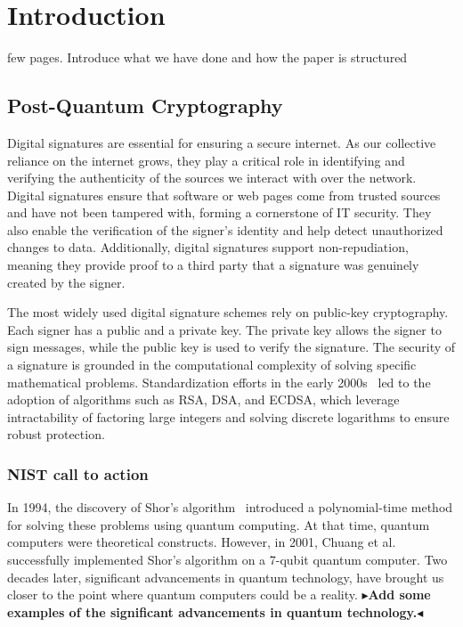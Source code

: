 \documentclass[twoside,11pt]{report}
\theoremstyle{definition}
\theoremstyle{plain}
\newcommand{\todo}[1]{{\color[rgb]{.5,0,0}\textbf{$\blacktriangleright$#1$\blacktriangleleft$}}}
\begin{document}

\chapter{Introduction}\label{ch:intro}

few pages. Introduce what we have done and how the paper is structured

\section{Post-Quantum Cryptography}\label{sec:quantum}

Digital signatures are essential for ensuring a secure internet. As our collective reliance on the internet grows, they play a critical role in identifying and verifying the authenticity of the sources we interact with over the network. Digital signatures ensure that software or web pages come from trusted sources and have not been tampered with, forming a cornerstone of IT security. They also enable the verification of the signer's identity and help detect unauthorized changes to data. Additionally, digital signatures support non-repudiation, meaning they provide proof to a third party that a signature was genuinely created by the signer.

The most widely used digital signature schemes rely on public-key cryptography. Each signer has a public and a private key. The private key allows the signer to sign messages, while the public key is used to verify the signature. The security of a signature is grounded in the computational complexity of solving specific mathematical problems. Standardization efforts in the early 2000s~\cite{pub2000digital} led to the adoption of algorithms such as RSA, DSA, and ECDSA, which leverage intractability of factoring large integers and solving discrete logarithms to ensure robust protection.

\subsection{NIST call to action}

In 1994, the discovery of Shor's algorithm~\cite{shor1997} introduced a polynomial-time method for solving these problems using quantum computing. At that time, quantum computers were theoretical constructs. However, in 2001, Chuang et al.~\cite{vandersypen2001experimental,buchmann2004post} successfully implemented Shor's algorithm on a 7-qubit quantum computer. Two decades later, significant advancements in quantum technology, have brought us closer to the point where quantum computers could be a reality.
\todo{Add some examples of the significant advancements in quantum technology.}
\end{document}
